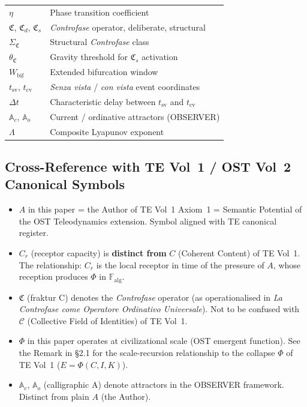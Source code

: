 \documentclass[12pt,a4paper]{article}
\newcommand{\reag}{C_r}
\newcommand{\Mpot}{A}
\newcommand{\Falg}{\mathbb{F}_{\mathrm{alg}}}
\newcommand{\CF}{\mathfrak{C}}           %
\newcommand{\CFd}{\mathfrak{C}_d}        %
\newcommand{\CFs}{\mathfrak{C}_s}        %
\newcommand{\SigmaCF}{\Sigma_{\mathfrak{C}}}  %
\newcommand{\thetaCF}{\theta_{\mathfrak{C}}}   %
\newcommand{\Ac}{\mathbb{A}_c}          %
\newcommand{\Ao}{\mathbb{A}_o}          %
\begin{document}
\begin{table}[H]
\begin{tabular}{@{}lp{9cm}@{}}
$\eta$ & Phase transition coefficient \\
$\CF$, $\CFd$, $\CFs$ & \textit{Controfase} operator, deliberate, structural \\
$\SigmaCF$ & Structural \textit{Controfase} class \\
$\thetaCF$ & Gravity threshold for $\CFs$ activation \\
$W_{\mathrm{bif}}$ & Extended bifurcation window \\
$t_{\mathrm{sv}}$, $t_{\mathrm{cv}}$ & \emph{Senza vista} / \emph{con vista} event coordinates \\
$\Delta t$ & Characteristic delay between $t_{\mathrm{sv}}$ and $t_{\mathrm{cv}}$ \\
$\Ac$, $\Ao$ & Current / ordinative attractors (OBSERVER) \\
$\Lambda$ & Composite Lyapunov exponent \\
\bottomrule
\end{tabular}
\end{table}

\subsection*{Cross-Reference with TE Vol~1 / OST Vol~2 Canonical Symbols}

\begin{itemize}[leftmargin=2em]
    \item $\Mpot$ in this paper = the Author of TE Vol~1 Axiom~1 = Semantic Potential of the OST Teleodynamics extension. Symbol aligned with TE canonical register.
    \item $\reag$ (receptor capacity) is \textbf{distinct from} $C$ (Coherent Content) of TE Vol~1. The relationship: $\reag$ is the local receptor in time of the pressure of $\Mpot$, whose reception produces $\Phi$ in $\Falg$.
    \item $\CF$ (fraktur C) denotes the \textit{Controfase} operator (as operationalised in \emph{La Controfase come Operatore Ordinativo Universale}). Not to be confused with $\mathcal{C}$ (Collective Field of Identities) of TE Vol~1.
    \item $\Phi$ in this paper operates at civilizational scale (OST emergent function). See the Remark in \S2.1 for the scale-recursion relationship to the collapse $\Phi$ of TE Vol~1 ($E = \Phi(C, I, K)$).
    \item $\Ac$, $\Ao$ (calligraphic A) denote attractors in the OBSERVER framework. Distinct from plain $\Mpot$ (the Author).
\end{itemize}
\end{document}
